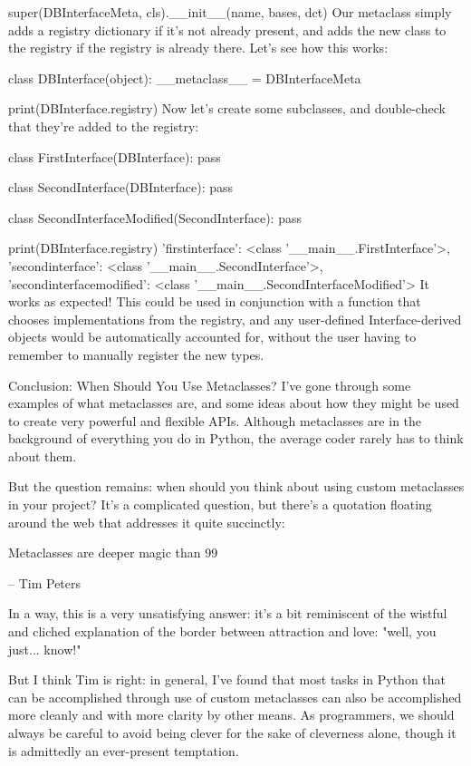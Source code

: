         super(DBInterfaceMeta, cls).__init__(name, bases, dct)
Our metaclass simply adds a registry dictionary if it's not already present, and adds the new class to the registry if the registry is already there. Let's see how this works:

class DBInterface(object):
    __metaclass__ = DBInterfaceMeta

print(DBInterface.registry)
{}
Now let's create some subclasses, and double-check that they're added to the registry:

class FirstInterface(DBInterface):
    pass

class SecondInterface(DBInterface):
    pass

class SecondInterfaceModified(SecondInterface):
    pass

print(DBInterface.registry)
{'firstinterface': <class '__main__.FirstInterface'>, 'secondinterface': <class '__main__.SecondInterface'>, 'secondinterfacemodified': <class '__main__.SecondInterfaceModified'>}
It works as expected! This could be used in conjunction with a function that chooses implementations from the registry, and any user-defined Interface-derived objects would be automatically accounted for, without the user having to remember to manually register the new types.

Conclusion: When Should You Use Metaclasses?
I've gone through some examples of what metaclasses are, and some ideas about how they might be used to create very powerful and flexible APIs. Although metaclasses are in the background of everything you do in Python, the average coder rarely has to think about them.

But the question remains: when should you think about using custom metaclasses in your project? It's a complicated question, but there's a quotation floating around the web that addresses it quite succinctly:

Metaclasses are deeper magic than 99%

– Tim Peters

In a way, this is a very unsatisfying answer: it's a bit reminiscent of the wistful and cliched explanation of the border between attraction and love: "well, you just... know!"

But I think Tim is right: in general, I've found that most tasks in Python that can be accomplished through use of custom metaclasses can also be accomplished more cleanly and with more clarity by other means. As programmers, we should always be careful to avoid being clever for the sake of cleverness alone, though it is admittedly an ever-present temptation.

